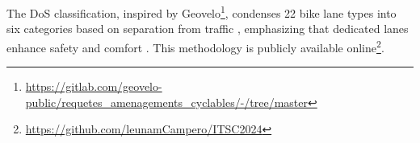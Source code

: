 \documentclass[lettersize,journal]{IEEEtran}
\begin{document}



The DoS classification, inspired by Geovelo\footnote{\url{https://gitlab.com/geovelo-public/requetes_amenagements_cyclables/-/tree/master}}, condenses 22 bike lane types into six categories based on separation from traffic \cite{2024graphbased}, emphasizing that dedicated lanes enhance safety and comfort \cite{nolan2021bicycle}. This methodology is publicly available online\footnote{\url{https://github.com/leunamCampero/ITSC2024}}.
\end{document}
